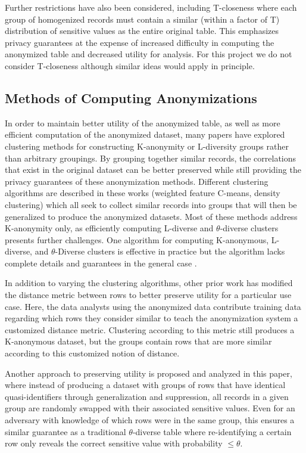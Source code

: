 Further restrictions have also been considered, including T-closeness\cite{litCloseness} where each group of homogenized records must contain a similar (within a factor of T) distribution of sensitive values as the entire original table. This emphasizes privacy guarantees at the expense of increased difficulty in computing the anonymized table and decreased utility for analysis. For this project we do not consider T-closeness although similar ideas would apply in principle.

\subsection{Methods of Computing Anonymizations}
In order to maintain better utility of the anonymized table, as well as more efficient computation of the anonymized dataset, many papers have explored clustering methods for constructing K-anonymity or L-diversity groups rather than arbitrary groupings. By grouping together similar records, the correlations that exist in the original dataset can be better preserved while still providing the privacy guarantees of these anonymization methods\cite{niClustering}\cite{liuDensity}\cite{chiuClustering}. Different clustering algorithms are described in these works (weighted feature C-means, density clustering) which all seek to collect similar records into groups that will then be generalized to produce the anonymized datasets. Most of these methods address K-anonymity only, as efficiently computing L-diverse and $\theta$-diverse clusters presents further challenges. One algorithm for computing K-anonymous, L-diverse, and $\theta$-Diverse clusters is effective in practice but the algorithm lacks complete details and guarantees in the general case \cite{yangEnhanced}.

In addition to varying the clustering algorithms, other prior work has modified the distance metric between rows to better preserve utility for a particular use case\cite{jiaPad}. Here, the data analysts using the anonymized data contribute training data regarding which rows they consider similar to teach the anonymization system a customized distance metric. Clustering according to this metric still produces a K-anonymous dataset, but the groups contain rows that are more similar according to this customized notion of distance.

Another approach to preserving utility is proposed and analyzed in this paper\cite{soriaSwapping}, where instead of producing a dataset with groups of rows that have identical quasi-identifiers through generalization and suppression, all records in a given group are randomly swapped with their associated sensitive values. Even for an adversary with knowledge of which rows were in the same group, this ensures a similar guarantee as a traditional $\theta$-diverse table where re-identifying a certain row only reveals the correct sensitive value with probability $\leq\theta$. 

